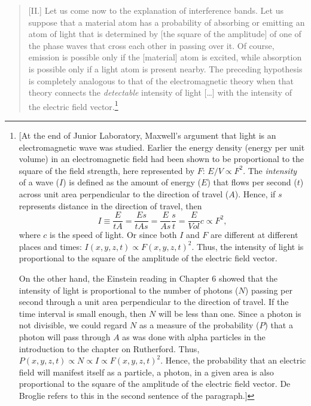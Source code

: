 \begin{quotation}
{[}II.{]} Let us come now to the explanation of interference bands. Let
us suppose that a material atom has a probability of absorbing or
emitting an atom of light that is determined by {[}the square of the
amplitude{]} of one of the phase waves that cross each other in passing
over it. Of course, emission is possible only if the {[}material{]} atom
is excited, while absorption is possible only if a light atom is present
nearby. The preceding hypothesis is completely analogous to that of the
electromagnetic theory when that theory connects the \emph{detectable}
intensity of light [\ldots] with the intensity of the electric field
vector.\footnote{[At the end of Junior Laboratory, Maxwell's argument
  that light is an electromagnetic wave was studied. Earlier the energy
  density (energy per unit volume) in an electromagnetic field had been
  shown to be proportional to the square of the field strength, here
  represented by $F$: $E/V \propto F^2$. The
  \emph{intensity} of a wave ($I$) is defined as the amount of
  energy ($E$) that flows per second ($t$) across unit area
  perpendicular to the direction of travel ($A$). Hence, if
  $s$ represents distance in the direction of travel, then
  \begin{equation*}
  I \equiv \frac{E}{tA} = \frac{Es}{tAs} = \frac{E}{As}\frac{s}{t} =
    \frac{E}{Vol}c \propto F^2 ,
  \end{equation*}
  where $c$ is the speed of light. Or since both $I$ and
  $F$ are different at different places and times:
  $I(x,y,z,t) \propto F(x,y,z,t)^2$. Thus, the
  intensity of light is proportional to the square of the amplitude of
  the electric field vector.

  On the other hand, the Einstein reading in Chapter 6 showed that the
  intensity of light is proportional to the number of photons ($N$)
  passing per second through a unit area perpendicular to the direction
  of travel. If the time interval is small enough, then $N$ will be
  less than one. Since a photon is not divisible, we could regard
  $N$ as a measure of the probability ($P$) that a photon will
  pass through $A$ as was done with alpha particles in the
  introduction to the chapter on Rutherford. Thus, $P(x,y,z,t) \propto N \propto I \propto
  F(x,y,z,t)^2$. Hence, the probability that an
  electric field will manifest itself as a particle, a photon, in a
  given area is also proportional to the square of the amplitude of the
  electric field vector. De Broglie refers to this in the second
  sentence of the paragraph.]}


\end{quotation}
